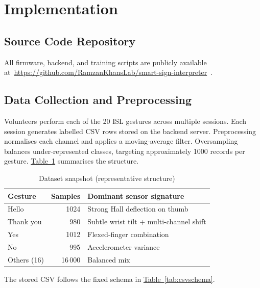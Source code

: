 \documentclass[conference]{IEEEtran}
\newcommand{\TabLink}[1]{\hyperref[#1]{Table~\ref*{#1}}}
\newcommand{\CodeRepoUrl}{https://github.com/RamzanKhansLab/smart-sign-interpreter}
\begin{document}
\section{Implementation}

\subsection{Source Code Repository}

All firmware, backend, and training scripts are publicly available
at~\url{\CodeRepoUrl}~\cite{githubrepo}.

\subsection{Data Collection and Preprocessing}

Volunteers perform each of the 20 ISL gestures across multiple sessions.
Each session generates labelled CSV rows stored on the backend server.
Preprocessing normalises each channel and applies a moving-average filter.
Oversampling balances under-represented classes, targeting approximately
1000 records per gesture. \TabLink{tab:dataset} summarises the structure.

\begin{table}[!t]
  \centering\caption{Dataset snapshot (representative structure)}\label{tab:dataset}
  \begin{tabularx}{\columnwidth}{@{}lrX@{}}
    \toprule Gesture & Samples & Dominant sensor signature \\\midrule
    Hello          & 1024    & Strong Hall deflection on thumb \\
    Thank you      &  980    & Subtle wrist tilt + multi-channel shift \\
    Yes            & 1012    & Flexed-finger combination \\
    No             &  995    & Accelerometer variance \\
    Others (16)    & 16\,000 & Balanced mix \\
    \bottomrule
  \end{tabularx}
\end{table}

The stored CSV follows the fixed schema in \TabLink{tab:csvschema}.
\end{document}

